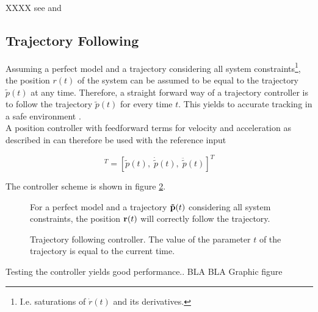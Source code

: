  XXXX see \cite{snider} and \cite{deluca}
\label{sec:controllerImplementation}
\subsection{Trajectory Following}
Assuming a perfect model and a trajectory considering all system constraints\footnote{I.e. saturations of $\dot{r}(t)$ and its derivatives.}, the position $r\left(t\right)$ of the system can be assumed to be equal to the trajectory $\tilde{p}(t)$ at any time. Therefore, a straight forward way of a trajectory controller is to follow the trajectory $\tilde{p}(t)$ for every time $t$. This yields to accurate tracking in a safe environment \cite{doesegger}.
\\
A position controller with feedforward terms for velocity and acceleration as described in \cite{meiermueri} can therefore be used with the reference input

\begin{equation}
  [r_{ref}(t), \; \dot{r}_{ref}(t), \; \ddot{r}_{ref}(t)]^T = [\tilde{p}(t), \; \dot{\tilde{p}}(t), \; \ddot{\tilde{p}}(t)]^T
\end{equation}

The controller scheme is shown in figure \ref{fig:trajectoryfollowing}. 

\begin{figure}[h]
    \centering
    \def\svgwidth{0.4\columnwidth}
    
    \caption{For a perfect model and a trajectory ${\bf \tilde{p}}(t)$ considering all system constraints, the position ${\bf{r}}(t)$ will correctly follow the trajectory.}
    \label{fig:scene_trajectoryFollowing}
\end{figure}

\begin{figure}[h]
    \centering
    \def\svgwidth{\columnwidth}
    
    \caption{Trajectory following controller. The value of the parameter $t$ of the trajectory is equal to the current time.}
    \label{fig:trajectoryfollowing}
\end{figure}


Testing the controller yields good performance.. BLA BLA Graphic figure 




